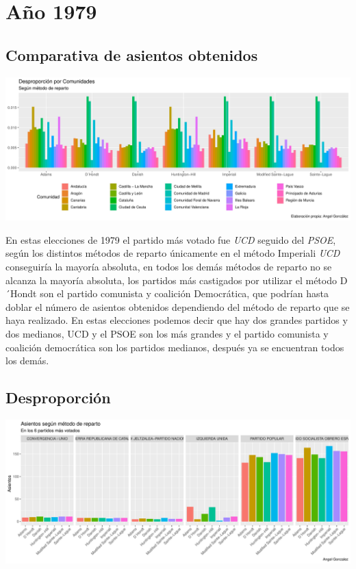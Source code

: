 \documentclass[12pt,a4paper,]{book}
\numberwithin{dummy}{section}
\theoremstyle{ocrenumbox}
\theoremstyle{blacknumex}
\theoremstyle{blacknumbox}
\theoremstyle{ocrenum}
\theoremstyle{ocrenum}
\begin{document}
\hypertarget{auxf1o-1979}{%
\section{Año 1979}\label{auxf1o-1979}}

\hypertarget{comparativa-de-asientos-obtenidos-1}{%
\subsection{Comparativa de asientos
obtenidos}\label{comparativa-de-asientos-obtenidos-1}}

\begin{center}\includegraphics[width=1\linewidth]{figurasR/unnamed-chunk-81-1} \end{center}

En estas elecciones de 1979 el partido más votado fue \emph{UCD} seguido
del \emph{PSOE}, según los distintos métodos de reparto únicamente en el
método Imperiali \emph{UCD} conseguiría la mayoría absoluta, en todos
los demás métodos de reparto no se alcanza la mayoría absoluta, los
partidos más castigados por utilizar el método D´Hondt son el partido
comunista y coalición Democrática, que podrían hasta doblar el número de
asientos obtenidos dependiendo del método de reparto que se haya
realizado. En estas elecciones podemos decir que hay dos grandes
partidos y dos medianos, UCD y el PSOE son los más grandes y el partido
comunista y coalición democrática son los partidos medianos, después ya
se encuentran todos los demás.

\hypertarget{desproporciuxf3n-1}{%
\subsection{Desproporción}\label{desproporciuxf3n-1}}

\begin{center}\includegraphics[width=1\linewidth]{figurasR/unnamed-chunk-82-1} \end{center}
\end{document}
